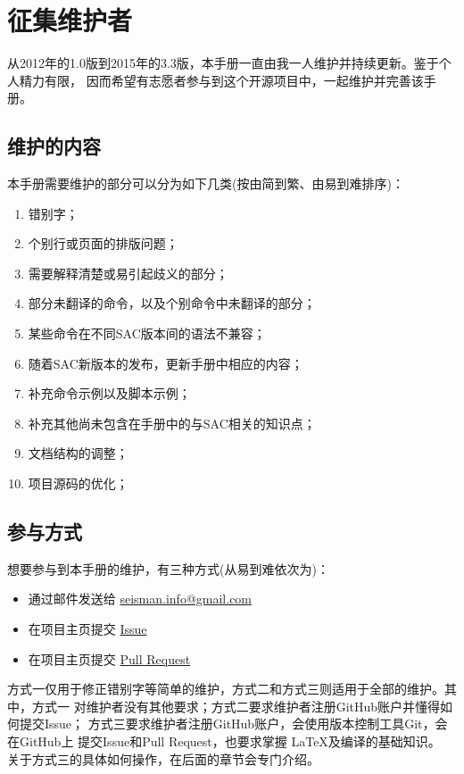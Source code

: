 \section{征集维护者}
从2012年的1.0版到2015年的3.3版，本手册一直由我一人维护并持续更新。鉴于个人精力有限，
因而希望有志愿者参与到这个开源项目中，一起维护并完善该手册。

\subsection{维护的内容}
本手册需要维护的部分可以分为如下几类(按由简到繁、由易到难排序)：
\begin{enumerate}
\item 错别字；
\item 个别行或页面的排版问题；
\item 需要解释清楚或易引起歧义的部分；
\item 部分未翻译的命令，以及个别命令中未翻译的部分；
\item 某些命令在不同SAC版本间的语法不兼容；
\item 随着SAC新版本的发布，更新手册中相应的内容；
\item 补充命令示例以及脚本示例；
\item 补充其他尚未包含在手册中的与SAC相关的知识点；
\item 文档结构的调整；
\item 项目源码的优化；
\end{enumerate}

\subsection{参与方式}
想要参与到本手册的维护，有三种方式(从易到难依次为)：
\begin{itemize}
\item 通过邮件发送给 \url{seisman.info@gmail.com}
\item 在项目主页提交 \href{https://github.com/seisman/SAC_Docs_zh/issues}{Issue}
\item 在项目主页提交 \href{https://github.com/seisman/SAC_Docs_zh/pulls}{Pull Request}
\end{itemize}
方式一仅用于修正错别字等简单的维护，方式二和方式三则适用于全部的维护。其中，方式一
对维护者没有其他要求；方式二要求维护者注册GitHub账户并懂得如何提交Issue；
方式三要求维护者注册GitHub账户，会使用版本控制工具Git，会在GitHub上
提交Issue和Pull Request，也要求掌握 \LaTeX 及编译的基础知识。
关于方式三的具体如何操作，在后面的章节会专门介绍。

